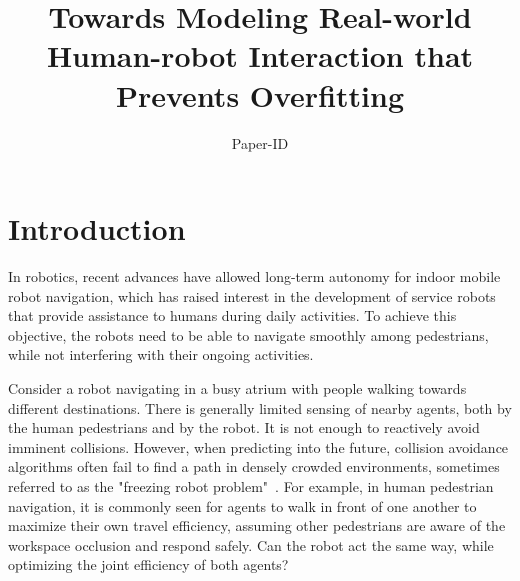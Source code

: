 \documentclass[conference]{IEEEtran}
\begin{document}
\title{Towards Modeling Real-world Human-robot Interaction that Prevents Overfitting}

\author{Paper-ID}



\maketitle


\IEEEpeerreviewmaketitle


\section{Introduction}
\vspace{-0.3em}
\label{sec:intro}
\noindent
In robotics, recent advances have allowed long-term autonomy for indoor mobile 
robot navigation, which has raised interest in the development of service 
robots that provide assistance to humans during daily activities. To achieve 
this objective, the robots need to be able to navigate smoothly among pedestrians, while 
not interfering with their ongoing activities. 

Consider a robot navigating in a busy atrium with people walking towards 
different destinations. There is generally limited sensing of nearby agents, 
both by the human pedestrians and by the robot. It is not enough to reactively 
avoid imminent collisions. However, when predicting into the future, 
collision avoidance algorithms often fail to find a path in 
densely crowded environments, sometimes referred to as the "freezing robot 
problem"~\cite{trautman2010unfreezing}. For example, in human pedestrian 
navigation, it is commonly seen for agents to walk in front of one 
another to maximize their own travel efficiency, assuming other pedestrians 
are aware of the workspace occlusion and respond safely. Can the robot act 
the same way, while optimizing the joint efficiency of both agents?  
\end{document}
